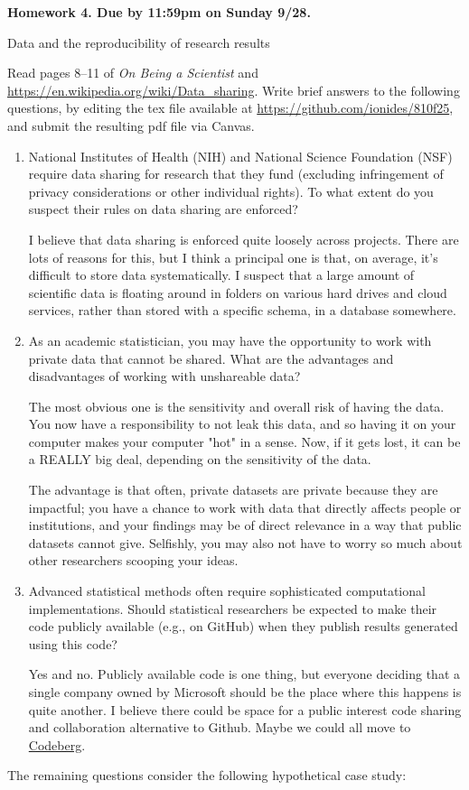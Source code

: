 \documentclass[12pt]{article}
\begin{document}
\begin{center}\bf
Homework 4. Due by 11:59pm on Sunday 9/28.

Data and the reproducibility of research results
\end{center}
Read pages 8--11 of {\em On Being a Scientist} and \url{https://en.wikipedia.org/wiki/Data_sharing}. Write brief answers to the following questions, by editing the tex file available at \url{https://github.com/ionides/810f25}, and submit the resulting pdf file via Canvas.

\begin{enumerate}

\item National Institutes of Health (NIH) and National Science Foundation (NSF) require data sharing for research that they fund (excluding infringement of privacy considerations or other individual rights). To what extent do you suspect their rules on data sharing are enforced?

I believe that data sharing is enforced quite loosely across projects. There are lots of reasons for this, but I think a principal one is that, on average, 
it's difficult to store data systematically. I suspect that a large amount of scientific data is floating around in folders on various hard drives and cloud services, rather than stored with a specific schema, in a database somewhere.

\item As an academic statistician, you may have the opportunity to work with private data that cannot be shared. What are the advantages and disadvantages of working with unshareable data?
  
The most obvious one is the sensitivity and overall risk of having the data. You now have a responsibility to not leak this data, and so having it on your computer makes your computer "hot" in a sense. Now, if it gets lost, it can be a REALLY big deal, depending on the sensitivity of the data.

The advantage is that often, private datasets are private because they are impactful; you have a chance to work with data that directly affects people 
or institutions, and your findings may be of direct relevance in a way that public datasets cannot give. Selfishly, you may also not have to worry so much about other researchers scooping your ideas.
  
\item Advanced statistical methods often require sophisticated computational implementations. Should statistical researchers be expected to make their code publicly available (e.g., on GitHub) when they publish results generated using this code?

Yes and no. Publicly available code is one thing, but everyone deciding that a single company owned by Microsoft should be the place where this happens is 
quite another. I believe there could be space for a public interest code sharing and collaboration alternative to Github. Maybe we could all move to \href{https://codeberg.org/}{Codeberg}.

\end{enumerate}
The remaining questions consider the following hypothetical case study:
\end{document}
